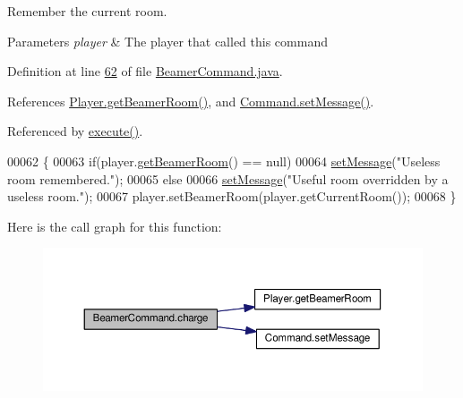 Remember the current room. 


\begin{DoxyParams}{Parameters}
{\em player} & The player that called this command \\
\hline
\end{DoxyParams}


Definition at line \hyperlink{BeamerCommand_8java_source_l00062}{62} of file \hyperlink{BeamerCommand_8java_source}{Beamer\-Command.\-java}.



References \hyperlink{Player_8java_source_l00151}{Player.\-get\-Beamer\-Room()}, and \hyperlink{Command_8java_source_l00049}{Command.\-set\-Message()}.



Referenced by \hyperlink{BeamerCommand_8java_source_l00025}{execute()}.


\begin{DoxyCode}
00062                                       \{
00063         \textcolor{keywordflow}{if}(player.\hyperlink{classPlayer_a9114998742351bf793e093cb198993ca}{getBeamerRoom}() == null)
00064             \hyperlink{classCommand_a715709d8f0ab65879d79ad1725c96f17}{setMessage}(\textcolor{stringliteral}{"Useless room remembered."});
00065         \textcolor{keywordflow}{else}
00066             \hyperlink{classCommand_a715709d8f0ab65879d79ad1725c96f17}{setMessage}(\textcolor{stringliteral}{"Useful room overridden by a useless room."});
00067         player.setBeamerRoom(player.getCurrentRoom());
00068     \}
\end{DoxyCode}


Here is the call graph for this function\-:
\nopagebreak
\begin{figure}[H]
\begin{center}
\leavevmode
\includegraphics[width=350pt]{classBeamerCommand_a130a572b2ec0532c92ea5033a098b1ac_cgraph}
\end{center}
\end{figure}




